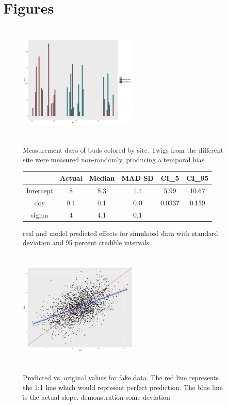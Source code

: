 \documentclass{article}\usepackage[]{graphicx}\usepackage[]{color}
\begin{document}


\section*{Figures}

\begin{figure}[h!]
\includegraphics[width=6cm, height=6cm]{temp_bias_fig.pdf}\\
\caption{Measurement days of buds colored by site. Twigs from the different site were measured non-randomly, producing a temporal bias}
\end{figure}


\begin{figure}
\begin{tabular}{c|c|c|c|c|c}
 & Actual & Median& MAD SD & CI_5 & CI_95\\
\hline
Intercept & 8 & 8.3 & 1.4 & 5.99 & 10.67\\
\hline
doy & 0.1 &0.1 & 0.0 & 0.0337 & 0.159\\
\hline
sigma & 4 & 4.1 & 0.1 &  & \\
\hline
\end{tabular}
\caption{real and model predicted effects for simulated data with standard deviation and 95 percent credible intervals}
\end{figure}

\begin{figure}[h!]
\includegraphics[width=6cm, height=6cm]{fake_predvsorig_final.pdf}\\
\caption{Predicted vs. original values for fake data. The red line represents the 1:1 line which would represent perfect prediction. The blue line is the actual slope, demonstration some deviation}
\end{figure}
\end{document}
